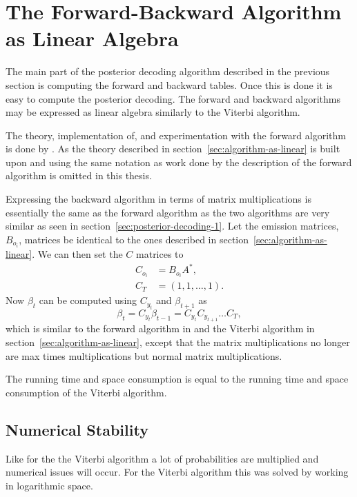\section{The Forward-Backward Algorithm as Linear Algebra}

The main part of the posterior decoding algorithm described in the previous
section is computing the forward and backward tables. Once this is done it is
easy to compute the posterior decoding. The forward and backward algorithms may
be expressed as linear algebra similarly to the Viterbi algorithm.

The theory, implementation of, and experimentation with the forward algorithm
is done by \citet{sand2013ziphmmlib}. As the theory described in
section~\ref{sec:algorithm-as-linear} is built upon and using the same notation
as work done by \citet{sand2013ziphmmlib} the description of the forward
algorithm is omitted in this thesis.

Expressing the backward algorithm in terms of matrix multiplications is
essentially the same as the forward algorithm as the two algorithms are very
similar as seen in section~\ref{sec:posterior-decoding-1}. Let the emission
matrices, $B_{o_i}$, matrices be identical to the ones described in
section~\ref{sec:algorithm-as-linear}. We can then set the $C$ matrices to
\begin{align*}
  C_{o_i} & = B_{o_i} A^*, \\
  C_T     & = (1, 1, \dots, 1).
\end{align*}
Now $\beta_t$ can be computed using $C_{y_t}$ and $\beta_{t + 1}$ as
\begin{equation*}
  \beta_t = C_{y_t} \beta_{t - 1} = C_{y_t} C_{y_{t+1}}\dots C_T,
\end{equation*}
which is similar to the forward algorithm in \citet{sand2013ziphmmlib} and the
Viterbi algorithm in section~\ref{sec:algorithm-as-linear}, except that the
matrix multiplications no longer are max times multiplications but normal
matrix multiplications.

The running time and space consumption is equal to the running time and space
consumption of the Viterbi algorithm.

\subsection{Numerical Stability}

Like for the the Viterbi algorithm a lot of probabilities are multiplied and
numerical issues will occur. For the Viterbi algorithm this was solved by
working in logarithmic space.

